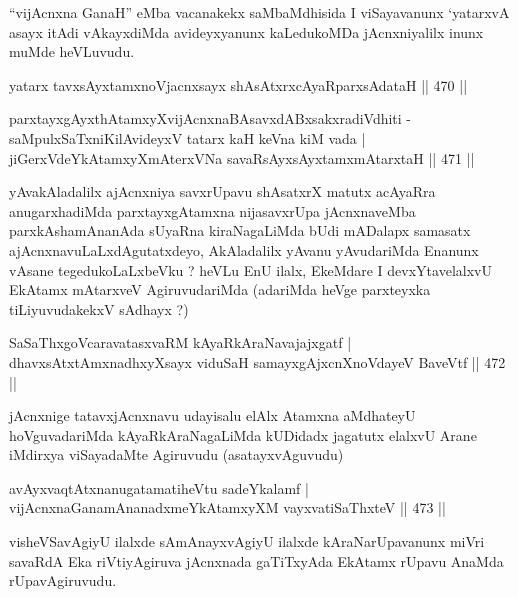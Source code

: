 \begin{artha}
``vijAcnxna GanaH'' eMba vacanakekx saMbaMdhisida I viSayavanunx
  `yatarxvA asayx itAdi vAkayxdiMda avideyxyanunx kaLedukoMDa
  jAcnxniyalilx inunx muMde heVLuvudu. 
\end{artha}


\begin{shl}
yatarx tavxsAyx\s \s tamxnoV\s jacnxsayx shAsAtxrxcAyaRparxsAdataH \hfill  || 470 ||
\end{shl}
\begin{shl}
parxtayxgAyxthAtamxyXvijAcnxnaBAsavxdABxsakxradiVdhiti -
saMpulxSaTxniKilAvideyxV tatarx kaH keVna kiM vada |
jiGerxVdeYkAtamxyXmAterxVNa savaRsAyxsAyx\s \s tamxmAtarxtaH \hfill  || 471 ||
\end{shl}

\begin{artha}
yAvakAladalilx ajAcnxniya savxrUpavu shAsatxrX matutx acAyaRra
anugarxhadiMda parxtayxgAtamxna nijasavxrUpa jAcnxnaveMba
parxkAshamAnanAda sUyaRna kiraNagaLiMda \-bUdi mADalapx samasatx
ajAcnxnavuLaLxdAgutatxdeyo, AkAladalilx yAvanu yAvuda\-riMda Enanunx
vAsane tegedukoLaLxbeVku ? heVLu EnU ilalx, EkeMdare I devxYta\-velalxvU
EkAtamx mAtarxveV AgiruvudariMda (adariMda heVge parxteyxka
tiLiyuvudakekxV sAdhayx ?)
\end{artha}

\begin{shl}
SaSaThxgoVcaravatasxvaRM kAyaRkAraNavajajxgatf |
dhavxsAtxtAmxnadhxyXsayx viduSaH samayxgAjxcnXnoVdayeV BaveVtf \hfill  || 472 ||
\end{shl}

\begin{artha}
jAcnxnige tatavxjAcnxnavu udayisalu elAlx Atamxna aMdhateyU
hoVguvadariMda kAyaRkAraNagaLiMda kUDidadx jagatutx elalxvU Arane
iMdirxya viSayadaMte Agiruvudu (asatayxvAguvudu)
\end{artha}

\begin{shl}
avAyxvaqtAtxnanugatamatiheVtu sadeYkalamf |
vijAcnxnaGanamAnanadxmeYkAtamxyXM vayxvatiSaThxteV \hfill  || 473 ||
\end{shl}

\begin{artha}
visheVSavAgiyU ilalxde sAmAnayxvAgiyU ilalxde kAraNarUpavanunx miVri savaRdA Eka riVtiyAgiruva jAcnxnada gaTiTxyAda EkAtamx rUpavu AnaMda rUpavAgiruvudu.
\end{artha}


